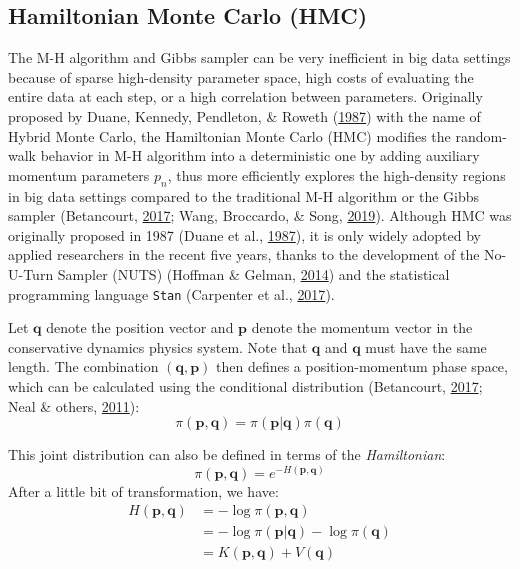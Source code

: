 \documentclass[12pt]{book}
\numberwithin{equation}{chapter}
\begin{document}
\hypertarget{hamiltonian-monte-carlo-hmc}{%
\subsection{Hamiltonian Monte Carlo (HMC)}\label{hamiltonian-monte-carlo-hmc}}

The M-H algorithm and Gibbs sampler can be very inefficient in big data settings because of sparse high-density parameter space, high costs of evaluating the entire data at each step, or a high correlation between parameters. Originally proposed by Duane, Kennedy, Pendleton, \& Roweth (\protect\hyperlink{ref-duane1987hybrid}{1987}) with the name of Hybrid Monte Carlo, the Hamiltonian Monte Carlo (HMC) modifies the random-walk behavior in M-H algorithm into a deterministic one by adding auxiliary momentum parameters \(p_n\), thus more efficiently explores the high-density regions in big data settings compared to the traditional M-H algorithm or the Gibbs sampler (Betancourt, \protect\hyperlink{ref-betancourt2017conceptual}{2017}; Wang, Broccardo, \& Song, \protect\hyperlink{ref-wang2019hamiltonian}{2019}). Although HMC was originally proposed in 1987 (Duane et al., \protect\hyperlink{ref-duane1987hybrid}{1987}), it is only widely adopted by applied researchers in the recent five years, thanks to the development of the No-U-Turn Sampler (NUTS) (Hoffman \& Gelman, \protect\hyperlink{ref-hoffman2014no}{2014}) and the statistical programming language \texttt{Stan} (Carpenter et al., \protect\hyperlink{ref-carpenter2017stan}{2017}).

Let \(\boldsymbol{q}\) denote the position vector and \(\boldsymbol{p}\) denote the momentum vector in the conservative dynamics physics system. Note that \(\boldsymbol{q}\) and \(\boldsymbol{q}\) must have the same length. The combination \((\boldsymbol{q}, \boldsymbol{p})\) then defines a position-momentum phase space, which can be calculated using the conditional distribution (Betancourt, \protect\hyperlink{ref-betancourt2017conceptual}{2017}; Neal \& others, \protect\hyperlink{ref-neal2011mcmc}{2011}):
\[\pi(\boldsymbol{p}, \boldsymbol{q}) = \pi(\boldsymbol{p}|\boldsymbol{q})\pi(\boldsymbol{q})\]

This joint distribution can also be defined in terms of the \emph{Hamiltonian}:
\[\pi(\boldsymbol{p}, \boldsymbol{q}) = e^{-H(\boldsymbol{p}, \boldsymbol{q})}\]
After a little bit of transformation, we have:
\begin{equation}
\begin{aligned}
H(\boldsymbol{p}, \boldsymbol{q}) &= -\log \pi(\boldsymbol{p}, \boldsymbol{q})\\
&= -\log\pi(\boldsymbol{p}|\boldsymbol{q}) - \log\pi(\boldsymbol{q})\\
&= K(\boldsymbol{p}, \boldsymbol{q}) + V(\boldsymbol{q})
\label{eq:hamiltonian}
\end{aligned}
\end{equation}
\end{document}
